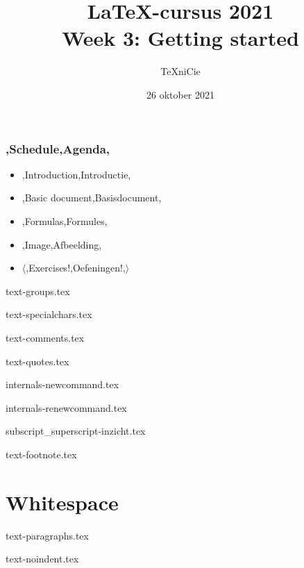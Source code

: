 \documentclass{cursuspresentatie}
\title[LaTeX-cursus 2021 -- Week 3]{%
    \texorpdfstring{\LaTeX{}-cursus 2021\\Week 3: Getting started}{%
        Week 3 -- LaTeX-cursus 2021%
    }%
}
\author{\TeX niCie}
\date{26 oktober 2021}
\def\importslide#1#2{%
    {#2}
}
\begin{document}


\begin{frame}
    \titlepage
    \centering
\end{frame}

\begin{frame}
    \frametitle{\lang,Schedule,Agenda,}
    
    \begin{itemize}
        \item \lang,Introduction,Introductie,
        \item \lang,Basic document,Basisdocument,
        \item \lang,Formulas,Formules,
        \item \lang,Image,Afbeelding,
        \item $ \mathbf\langle $\lang,Exercises!,Oefeningen!,$ \rangle $
    \end{itemize}
\end{frame}

    \clearrecentlist

    \def\assetdir{assets}

    \importslide{text}{text-groups.tex}

    \importslide{text}{text-specialchars.tex}

    \importslide{text}{text-comments.tex}

    \importslide{text}{text-quotes.tex}

    \importslide{internals}{internals-newcommand.tex}

    \importslide{internals}{internals-renewcommand.tex}

    \importslide{math}{subscript_superscript-inzicht.tex}

    \importslide{text}{text-footnote.tex}

    \section{Whitespace}

    \importslide{text}{text-paragraphs.tex}

    \importslide{text}{text-noindent.tex}
\end{document}
